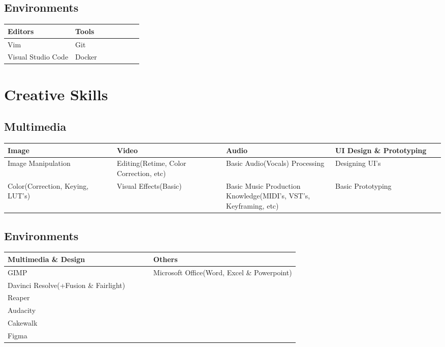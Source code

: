 \documentclass{article}
\newcommand{\linedel}{\vspace{-1.9em}}
\newcommand{\quarterwidth}{0.25\linewidth}
\newcommand{\halfwidth}{0.50\linewidth}
\begin{document}
		\subsection{Environments}
			\linedel
			\begin{table}[h!]
				\begin{tabular}[c]{|p{\halfwidth}|p{\halfwidth}|}
					\toprule
					\textbf{Editors}	&	\textbf{Tools}	\\
					\midrule
					Vim					&	Git				\\
					Visual Studio Code	&	Docker			\\
					\bottomrule
				\end{tabular}
			\end{table}

	\section{Creative Skills}
		\subsection{Multimedia}
			\linedel
			\begin{table}[h!]
				\begin{tabular}[c]{|p{\quarterwidth}|p{\quarterwidth}|p{\quarterwidth}|p{\quarterwidth}|}
					\toprule
					\textbf{Image} 						& 	\textbf{Video} 							& \textbf{Audio} 														& \textbf{UI Design \newline\& Prototyping}		\\
					\midrule
					Image Manipulation					&	Editing(Retime, Color Correction, etc)	&	Basic Audio(Vocals) Processing										&	Designing UI's		\\
					Color(Correction, Keying, LUT's)	&   Visual Effects(Basic)					&   Basic Music Production Knowledge(MIDI's, VST's, Keyframing, etc)	&   Basic Prototyping	\\
					\bottomrule
				\end{tabular}
			\end{table}
		\subsection{Environments}
			\linedel
			\begin{table}[h!]
				\begin{tabular}[c]{|p{\halfwidth}|p{\halfwidth}|}
					\toprule
					\textbf{Multimedia \& Design}			& 	\textbf{Others}		\\
					\midrule
					GIMP									&	Microsoft Office(Word, Excel \& Powerpoint) \\
					Davinci Resolve(+Fusion \& Fairlight)	&					\\
					Reaper									&					\\
					Audacity								&					\\
					Cakewalk								&					\\
					Figma									&					\\
					\bottomrule
				\end{tabular}
			\end{table}
	\newpage
\end{document}
